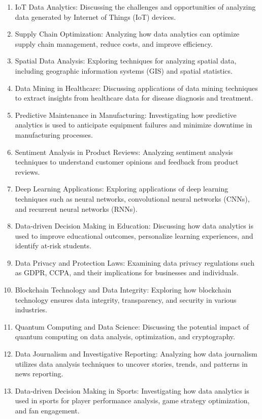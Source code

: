 \documentclass[12pt]{article}
\begin{document}
\begin{enumerate}
        \item IoT Data Analytics: Discussing the challenges and opportunities of analyzing data generated by Internet of Things (IoT) devices.
        \item Supply Chain Optimization: Analyzing how data analytics can optimize supply chain management, reduce costs, and improve efficiency.
        \item Spatial Data Analysis: Exploring techniques for analyzing spatial data, including geographic information systems (GIS) and spatial statistics.
        \item Data Mining in Healthcare: Discussing applications of data mining techniques to extract insights from healthcare data for disease diagnosis and treatment. 
        \item Predictive Maintenance in Manufacturing: Investigating how predictive analytics is used to anticipate equipment failures and minimize downtime in manufacturing processes.
        \item Sentiment Analysis in Product Reviews: Analyzing sentiment analysis techniques to understand customer opinions and feedback from product reviews.
        \item Deep Learning Applications: Exploring applications of deep learning techniques such as neural networks, convolutional neural networks (CNNs), and recurrent neural networks (RNNs).
        \item Data-driven Decision Making in Education: Discussing how data analytics is used to improve educational outcomes, personalize learning experiences, and identify at-risk students.
        \item Data Privacy and Protection Laws: Examining data privacy regulations such as GDPR, CCPA, and their implications for businesses and individuals.
        \item Blockchain Technology and Data Integrity: Exploring how blockchain technology ensures data integrity, transparency, and security in various industries.
        \item Quantum Computing and Data Science: Discussing the potential impact of quantum computing on data analysis, optimization, and cryptography.
        \item Data Journalism and Investigative Reporting: Analyzing how data journalism utilizes data analysis techniques to uncover stories, trends, and patterns in news reporting.
        \item Data-driven Decision Making in Sports: Investigating how data analytics is used in sports for player performance analysis, game strategy optimization, and fan engagement.

\end{enumerate}
\end{document}
